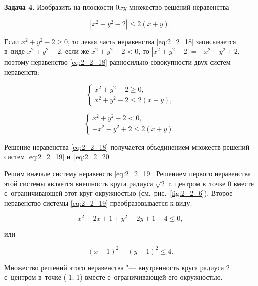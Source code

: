 \textbf{Задача 4.}\label{ex:2_2_4} Изобразить на плоскости $0xy$ множество
решений неравенства

\begin{equation}\label{eq:2_2_18}
\left| x^{2} + y^{2} - 2 \right| \leqslant 2(x + y).
\end{equation}

Если $x^{2} + y^{2} - 2 \geqslant 0$, то левая часть неравенства \eqref{eq:2_2_18}
записывается в~виде $x^{2} + y^{2} - 2$, если же $x^{2} + y^{2} - 2 < 0$,
то $\left| x^{2} + y^{2} - 2 \right| = -x^{2} - y^{2} + 2$, поэтому неравенство
\eqref{eq:2_2_18} равносильно совокупности двух систем неравенств:

\begin{equation}\label{eq:2_2_19}
\begin{cases}
x^{2} + y^{2} - 2 \geqslant 0, \\
x^{2} + y^{2} - 2 \leqslant 2(x + y),
\end{cases}
\end{equation}

\begin{equation}\label{eq:2_2_20}
\begin{cases}
x^{2} + y^{2} - 2 < 0, \\
-x^{2} - y^{2} + 2 \leqslant 2(x + y).
\end{cases}
\end{equation}

Решение неравенства \eqref{eq:2_2_18} получается объединением множеств
решений систем \eqref{eq:2_2_19} и~\eqref{eq:2_2_20}.

Решим вначале систему неравенств \eqref{eq:2_2_19}. Решением первого
неравенства этой системы является внешность круга радиуса $\sqrt{2}$ c~центром
в~точке 0 вместе с~ограничивающей этот круг окружностью
(см.\ рис.\ \ref{fig:2_2_6}). Второе неравенство системы \eqref{eq:2_2_19}
преобразовывается к виду:

\begin{equation*}
x^{2} - 2x + 1 + y^{2} - 2y + 1 -4 \leqslant 0,
\end{equation*}

\noindent
или

\begin{equation}\label{eq:2_2_21}
(x - 1)^{2} + (y - 1)^{2} \leqslant 4.
\end{equation}

Множество решений этого неравенства "--- внутренность круга радиуса 2
с~центром в~точке (-1; 1) вместе с~ограничивающей его окружностью.

